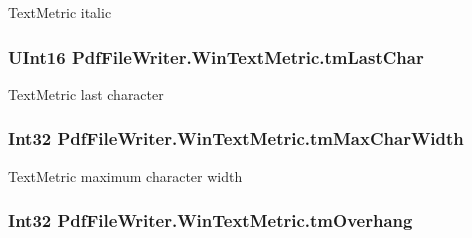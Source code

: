 Text\+Metric italic 

\subsubsection[{\texorpdfstring{tm\+Last\+Char}{tmLastChar}}]{\setlength{\rightskip}{0pt plus 5cm}U\+Int16 Pdf\+File\+Writer.\+Win\+Text\+Metric.\+tm\+Last\+Char\hspace{0.3cm}{\ttfamily [get]}}\hypertarget{class_pdf_file_writer_1_1_win_text_metric_af6acf24a525ef58e9861b94daa75389b}{}\label{class_pdf_file_writer_1_1_win_text_metric_af6acf24a525ef58e9861b94daa75389b}


Text\+Metric last character 

\subsubsection[{\texorpdfstring{tm\+Max\+Char\+Width}{tmMaxCharWidth}}]{\setlength{\rightskip}{0pt plus 5cm}Int32 Pdf\+File\+Writer.\+Win\+Text\+Metric.\+tm\+Max\+Char\+Width\hspace{0.3cm}{\ttfamily [get]}}\hypertarget{class_pdf_file_writer_1_1_win_text_metric_ae789d85e914eee551839a58c469e7022}{}\label{class_pdf_file_writer_1_1_win_text_metric_ae789d85e914eee551839a58c469e7022}


Text\+Metric maximum character width 

\subsubsection[{\texorpdfstring{tm\+Overhang}{tmOverhang}}]{\setlength{\rightskip}{0pt plus 5cm}Int32 Pdf\+File\+Writer.\+Win\+Text\+Metric.\+tm\+Overhang\hspace{0.3cm}{\ttfamily [get]}}\hypertarget{class_pdf_file_writer_1_1_win_text_metric_a9640f49736e8a6e59f23516f14481d82}{}\label{class_pdf_file_writer_1_1_win_text_metric_a9640f49736e8a6e59f23516f14481d82}


